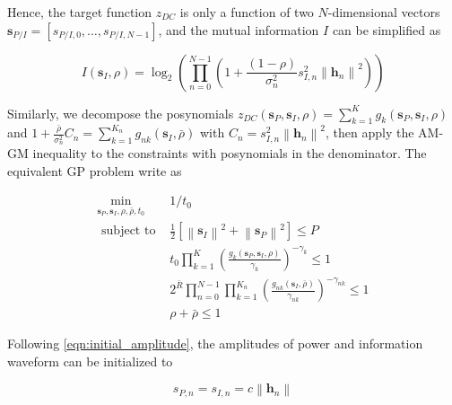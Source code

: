 Hence, the target function ${z_{DC}}$ is only a function of two $N$-dimensional vectors ${{\mathbf{s}}_{P/I}} = \left[ {{s_{P/I,0}}, \ldots ,{s_{P/I,N - 1}}} \right]$, and the mutual information $I$ can be simplified as

\begin{equation}\label{eqn:decoupled_mutual_information}
  I\left( {{{\mathbf{s}}_I},\rho } \right) = {\log _2}\left( {\prod\limits_{n = 0}^{N - 1} {\left( {1 + \frac{{(1 - \rho )}}{{\sigma _n^2}}s_{I,n}^2{{\left\| {{{\mathbf{h}}_n}} \right\|}^2}} \right)} } \right)
\end{equation}

Similarly, we decompose the posynomials ${z_{DC}}\left( {{{\mathbf{s}}_P},{{\mathbf{s}}_I},\rho } \right) = \sum\limits_{k = 1}^K {{g_k}} \left( {{{\mathbf{s}}_P},{{\mathbf{s}}_I},\rho } \right)$ and $1 + \frac{{\bar \rho }}{{\sigma _n^2}}{C_n} = \sum\limits_{k = 1}^{{K_n}} {{g_{nk}}} \left( {{{\mathbf{s}}_I},\bar \rho } \right)$ with ${C_n} = s_{I,n}^2{\left\| {{{\mathbf{h}}_n}} \right\|^2}$, then apply the AM-GM inequality to the constraints with posynomials in the denominator. The equivalent GP problem write as

\begin{eqnarray}
  {\mathop {\min }\limits_{{{\mathbf{s}}_P},{{\mathbf{s}}_I},\rho ,\bar \rho ,{t_0}} }&{1/{t_0}} \label{eqn:decoupled_target} \\
  {{\text{ subject to }}}&{\frac{1}{2}\left[ {\left\| {{{\mathbf{s}}_I}} \right\|^2 + \left\| {{{\mathbf{s}}_P}} \right\|^2} \right] \leqslant P} \label{eqn:decoupled_power_constraint} \\
  {}&{{t_0}\prod\limits_{k = 1}^K {{{\left( {\frac{{{g_k}\left( {{{\mathbf{s}}_P},{{\mathbf{s}}_I},\rho } \right)}}{{{\gamma _k}}}} \right)}^{ - {\gamma _k}}}}  \leqslant 1} \label{eqn:decoupled_current_constraint} \\
  {}&{2^{\bar R}}\prod\limits_{n = 0}^{N - 1} {\prod\limits_{k = 1}^{{K_n}} {{{\left( {\frac{{{g_{nk}}\left( {{{\mathbf{s}}_I},\bar \rho } \right)}}{{{\gamma _{nk}}}}} \right)}^{ - {\gamma _{nk}}}}} }  \leqslant 1 \label{eqn:decoupled_rate_constraint} \\
  {}&{\rho  + \bar \rho  \leqslant 1} \label{eqn:decoupled_ratio_constraint}
\end{eqnarray}

Following \eqref{eqn:initial_amplitude}, the amplitudes of power and information waveform can be initialized to

\begin{equation}\label{eqn:initial_amplitude_decoupled}
  {s_{P,n}} = {s_{I,n}} = c\left\| {{{\mathbf{h}}_n}} \right\|
\end{equation}


